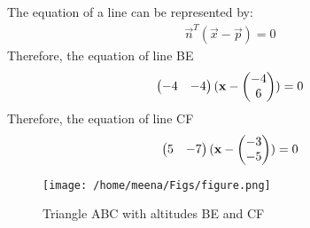 \documentclass[12pt]{article}
\begin{document}
The equation of a line can be represented by:
\begin{align}
\vec{n}^{T}(\vec{x}-\vec{p})=0
\end{align}
Therefore, the equation of line BE
\begin{align}
\begin{pmatrix}-4&-4\end{pmatrix}(\mathbf{x}-\begin{pmatrix}-4\\6\\\end{pmatrix})=0
\end{align}
Therefore, the equation of line CF
\begin{align}
\begin{pmatrix}5&-7\end{pmatrix}(\mathbf{x}-\begin{pmatrix}-3\\-5\\\end{pmatrix})=0
\end{align}
\begin{figure} [htbp]
\texttt{[image: /home/meena/Figs/figure.png]}
\caption{Triangle ABC with altitudes BE and CF}
\label{fig}
\end{figure}
\end{document}

